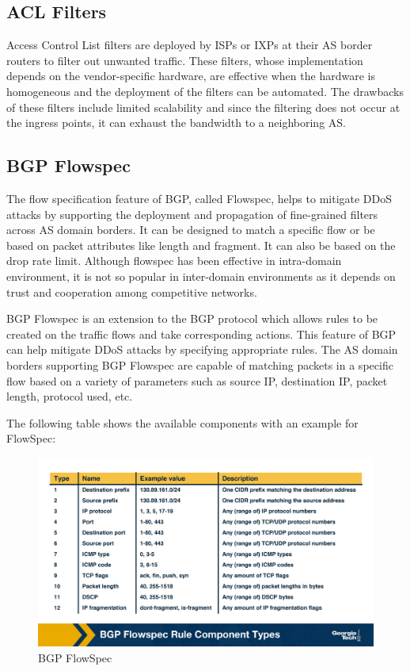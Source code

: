 \documentclass[11pt]{article}
\begin{document}
\subsection{ACL Filters}
\label{sec:org7434d75}

Access Control List filters are deployed by ISPs or IXPs at their AS border routers to filter out unwanted traffic. These filters, whose implementation depends on the vendor-specific hardware, are effective when the hardware is homogeneous and the deployment of the filters can be automated. The drawbacks of these filters include limited scalability and since the filtering does not occur at the ingress points, it can exhaust the bandwidth to a neighboring AS.



\subsection{BGP Flowspec}
\label{sec:orged75e39}

The flow specification feature of BGP, called Flowspec, helps to mitigate DDoS attacks by supporting the deployment and propagation of fine-grained filters across AS domain borders. It can be designed to match a specific flow or be based on packet attributes like length and fragment. It can also be based on the drop rate limit. Although flowspec has been effective in intra-domain environment, it is not so popular in inter-domain environments as it depends on trust and cooperation among competitive networks. 

BGP Flowspec is an extension to the BGP protocol which allows rules to be created on the traffic flows and take corresponding actions. This feature of BGP can help mitigate DDoS attacks by specifying appropriate rules. The AS domain borders supporting BGP Flowspec are capable of matching packets in a specific flow based on a variety of parameters such as source IP, destination IP, packet length, protocol used, etc.

The following table shows the available components with an example for FlowSpec:

\begin{figure}[htbp]
\centering
\includegraphics[width=.9\linewidth]{./MD_Figures/9_bgp_flowspec.png}
\caption{\label{fig:org12f699e}BGP FlowSpec}
\end{figure}
\end{document}
